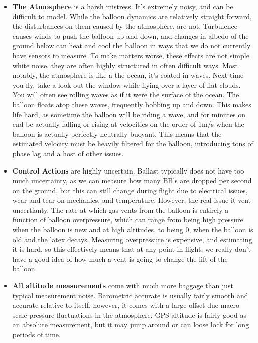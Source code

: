 \documentclass[11pt]{article}
\begin{document}
\begin{itemize}
\item \textbf{The Atmosphere} is a harsh mistress. It's extremely noisy, and can be difficult to model. While the balloon dynamics are relatively straight forward, the disturbances on them caused by the atmosphere, are not. Turbulence causes winds to push the balloon up and down, and changes in albedo of the ground below can heat and cool the balloon in ways that we do not currently have sensors to measure. To make matters worse, these effects are not simple white noise, they are often highly structured in often difficult ways. Most notably, the atmosphere is like a the ocean, it's coated in waves. Next time you fly, take a look out the window while flying over a layer of flat clouds. You will often see rolling waves as if it were the surface of the ocean. The balloon floats atop these waves, frequently bobbing up and down. This makes life hard, as sometime the balloon will be riding a wave, and for minutes on end be actually falling or rising at velocities on the order of 1m/s when the balloon is actually perfectly neutrally buoyant. This means that the estimated velocity must be heavily filtered for the balloon, introducing tons of phase lag and a host of other issues.

\item \textbf{Control Actions} are highly uncertain. Ballast typically does not have too much uncertainty, as we can measure how many BB's are dropped per second on the ground, but this can still change during flight due to electrical issues, wear and tear on mechanics, and temperature. However, the real issue it vent uncertianty. The rate at which gas vents from the balloon is entirely a function of balloon overpressure, which can range from being high pressure when the balloon is new and at high altitudes, to being 0, when the balloon is old and the latex decays. Measuring overpressure is expensive, and estimating it is hard, so this effectively means that at any point in flight, we really don't have a good idea of how much a vent is going to change the lift of the balloon.

\item \textbf{All altitude measurements} come with much more baggage than just typical measurement noise. Barometric accurate is usually fairly smooth and accurate relative to itself. however, it comes with a large offset due macro scale pressure fluctuations in the atmosphere. GPS altitude is fairly good as an absolute measurement, but it may jump around or can loose lock for long periods of time. 

\end{itemize}
\end{document}
